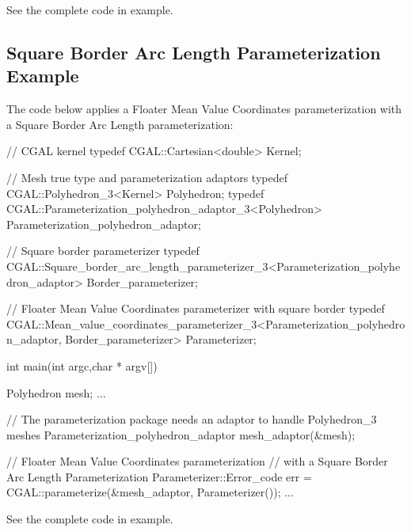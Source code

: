 See the complete code in  example.


\subsection{Square Border Arc Length Parameterization Example}

The code below applies a Floater Mean Value Coordinates parameterization
with a Square Border Arc Length parameterization:

\begin{ccExampleCode}

// CGAL kernel
typedef CGAL::Cartesian<double>                         Kernel;

// Mesh true type and parameterization adaptors
typedef CGAL::Polyhedron_3<Kernel>                      Polyhedron;
typedef CGAL::Parameterization_polyhedron_adaptor_3<Polyhedron>
                                                        Parameterization_polyhedron_adaptor;

// Square border parameterizer
typedef CGAL::Square_border_arc_length_parameterizer_3<Parameterization_polyhedron_adaptor>
                                                        Border_parameterizer;

// Floater Mean Value Coordinates parameterizer with square border
typedef CGAL::Mean_value_coordinates_parameterizer_3<Parameterization_polyhedron_adaptor,
                                                     Border_parameterizer>
                                                        Parameterizer;

int main(int argc,char * argv[])
{
    Polyhedron mesh;
    ...

    // The parameterization package needs an adaptor to handle Polyhedron_3 meshes
    Parameterization_polyhedron_adaptor mesh_adaptor(&mesh);

    // Floater Mean Value Coordinates parameterization
    // with a Square Border Arc Length Parameterization
    Parameterizer::Error_code err = CGAL::parameterize(&mesh_adaptor, Parameterizer());
    ...
}

\end{ccExampleCode}

See the complete code in  example.
